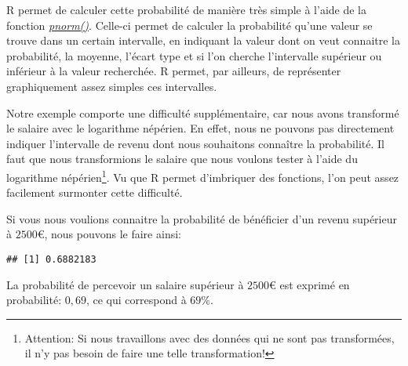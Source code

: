 \documentclass[
]{book}
\newenvironment{Shaded}{\begin{snugshade}}{\end{snugshade}}
\newcommand{\AttributeTok}[1]{\textcolor[rgb]{0.77,0.63,0.00}{#1}}
\newcommand{\CommentTok}[1]{\textcolor[rgb]{0.56,0.35,0.01}{\textit{#1}}}
\newcommand{\DecValTok}[1]{\textcolor[rgb]{0.00,0.00,0.81}{#1}}
\newcommand{\FunctionTok}[1]{\textcolor[rgb]{0.00,0.00,0.00}{#1}}
\newcommand{\NormalTok}[1]{#1}
\newcommand{\SpecialCharTok}[1]{\textcolor[rgb]{0.00,0.00,0.00}{#1}}
\begin{document}
R permet de calculer cette probabilité de manière très simple à l'aide de la fonction \href{https://www.rdocumentation.org/packages/stats/versions/3.6.2/topics/Normal}{\emph{pnorm()}}. Celle-ci permet de calculer la probabilité qu'une valeur se trouve dans un certain intervalle, en indiquant la valeur dont on veut connaitre la probabilité, la moyenne, l'écart type et si l'on cherche l'intervalle supérieur ou inférieur à la valeur recherchée. R permet, par ailleurs, de représenter graphiquement assez simples ces intervalles.

Notre exemple comporte une difficulté supplémentaire, car nous avons transformé le salaire avec le logarithme népérien. En effet, nous ne pouvons pas directement indiquer l'intervalle de revenu dont nous souhaitons connaître la probabilité. Il faut que nous transformions le salaire que nous voulons tester à l'aide du logarithme népérien\footnote{Attention: Si nous travaillons avec des données qui ne sont pas transformées, il n'y pas besoin de faire une telle transformation!}. Vu que R permet d'imbriquer des fonctions, l'on peut assez facilement surmonter cette difficulté.

Si vous nous voulions connaitre la probabilité de bénéficier d'un revenu supérieur à \(2500€\), nous pouvons le faire ainsi:

\begin{Shaded}
\end{Shaded}

\begin{verbatim}
## [1] 0.6882183
\end{verbatim}

La probabilité de percevoir un salaire supérieur à \(2500€\) est exprimé en probabilité: \(0,69\), ce qui correspond à \(69\%\).
\end{document}

